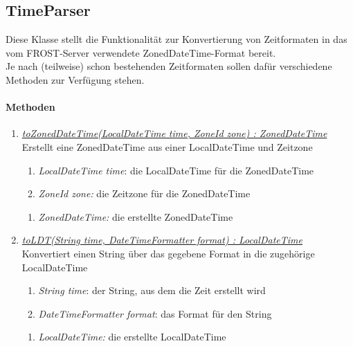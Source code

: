 \subsection{TimeParser}

Diese Klasse stellt die Funktionalität zur Konvertierung von Zeitformaten in das vom FROST-Server verwendete ZonedDateTime-Format bereit. \\
Je nach (teilweise) schon bestehenden Zeitformaten sollen dafür verschiedene Methoden zur Verfügung stehen.


\paragraph{Methoden}
\begin{enumerate}[+]
	
	\item \underline{\textit{toZonedDateTime(LocalDateTime time, ZoneId zone) : ZonedDateTime}}\\
	Erstellt eine ZonedDateTime aus einer LocalDateTime und Zeitzone
	\begin{enumerate}[$\bullet$]
		\item \textit{LocalDateTime time}: die LocalDateTime für die ZonedDateTime
		\item \textit{ZoneId zone:} die Zeitzone für die ZonedDateTime
	\end{enumerate}
	\vspace{-0.2cm}
	\begin{enumerate}[$\circ$]
		\item \textit{ZonedDateTime:} die erstellte ZonedDateTime
	\end{enumerate}
	
	\item \underline{\textit{toLDT(String time, DateTimeFormatter format) : LocalDateTime}}\\
	Konvertiert einen String über das gegebene Format in die zugehörige LocalDateTime
	\begin{enumerate}[$\bullet$]
		\item \textit{String time}: der String, aus dem die Zeit erstellt wird
		\item \textit{DateTimeFormatter format}: das Format für den String
	\end{enumerate}
	\vspace{-0.2cm}
	\begin{enumerate}[$\circ$]
		\item \textit{LocalDateTime:} die erstellte LocalDateTime
	\end{enumerate}
	

\end{enumerate}
